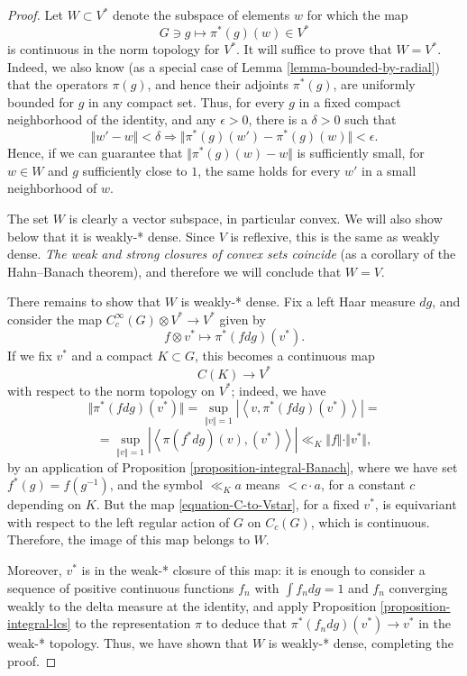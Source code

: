 \begin{proof}
Let $W\subset V^*$ denote the subspace of elements $w$ for which the map 
$$ G \ni g \mapsto \pi^*(g) (w)\in V^*$$
is continuous in the norm topology for $V^*$. It will suffice to prove that $W=V^*$. Indeed, we also know (as a special case of Lemma \ref{lemma-bounded-by-radial}) that the operators $\pi(g)$, and hence their adjoints $\pi^*(g)$, are uniformly bounded for $g$ in any compact set. Thus, for every $g$ in a fixed compact neighborhood of the identity, and any $\epsilon >0$, there is a $\delta>0$ such that 
$$ \Vert w' - w\Vert <\delta \Rightarrow \Vert \pi^*(g)(w') - \pi^*(g)(w)\Vert <\epsilon.$$
Hence, if we can guarantee that $\Vert \pi^*(g)(w) - w\Vert$ is sufficiently small, for $w\in W$ and $g$ sufficiently close to $1$, the same holds for every $w'$ in a small neighborhood of $w$. 

The set $W$ is clearly a vector subspace, in particular convex. We will also show below that it is weakly-* dense. Since $V$ is reflexive, this is the same as weakly dense. \emph{The weak and strong closures of convex sets coincide} (as a corollary of the Hahn--Banach theorem), and therefore we will conclude that $W=V$.

There remains to show that $W$ is weakly-* dense. Fix a left Haar measure $dg$, and consider the map $C_c^\infty(G)\otimes V^*\to V^*$ given by 
\begin{equation}
\label{equation-C-to-Vstar} 
f \otimes v^*\mapsto \pi^*(fdg)(v^*).
\end{equation}
If we fix $v^*$ and a compact $K\subset G$, this becomes a continuous map
$$ C(K)\to V^*$$
with respect to the norm topology on $V^*$; indeed, we have
$$ \Vert \pi^*(fdg)(v^*) \Vert = \sup_{\Vert v\Vert = 1} |\left< v, \pi^*(fdg)(v^*)\right> | = $$
$$ = \sup_{\Vert v\Vert = 1} |\left< \pi(f^*dg) (v), (v^*)\right> | \ll_K \Vert f\Vert \cdot \Vert v^*\Vert,$$
by an application of Proposition \ref{proposition-integral-Banach}, where we have set $f^*(g) = f(g^{-1})$, and the symbol $\ll_K a$ means $< c\cdot a$, for a constant $c$ depending on $K$. But the map \eqref{equation-C-to-Vstar}, for a fixed $v^*$, is equivariant with respect to the left regular action of $G$ on $C_c(G)$, which is continuous. Therefore, the image of this map belongs to $W$.


Moreover, $v^*$ is in the weak-* closure of this map: it is enough to consider a sequence of positive continuous functions $f_n$ with $\int f_n dg=1$ and $f_n$ converging weakly to the delta measure at the identity, and apply Proposition \ref{proposition-integral-lcs} to the representation $\pi$ to deduce that $\pi^*(f_ndg)(v^*)\to v^*$ in the weak-* topology. Thus, we have shown that $W$ is weakly-* dense, completing the proof.


 
 
 
\end{proof}


